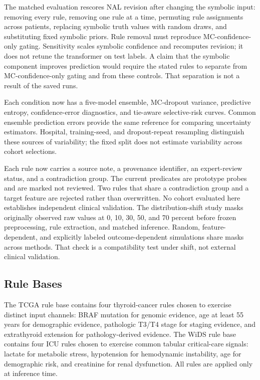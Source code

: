 \documentclass{article}
\begin{document}
The matched evaluation rescores NAL revision after changing the symbolic input: removing every rule, removing one rule at a time, permuting rule assignments across patients, replacing symbolic truth values with random draws, and substituting fixed symbolic priors. Rule removal must reproduce MC-confidence-only gating. Sensitivity scales symbolic confidence and recomputes revision; it does not retune the transformer on test labels. A claim that the symbolic component improves prediction would require the stated rules to separate from MC-confidence-only gating and from these controls. That separation is not a result of the saved runs.

Each condition now has a five-model ensemble, MC-dropout variance, predictive entropy, confidence-error diagnostics, and tie-aware selective-risk curves. Common ensemble prediction errors provide the same reference for comparing uncertainty estimators. Hospital, training-seed, and dropout-repeat resampling distinguish these sources of variability; the fixed split does not estimate variability across cohort selections.

Each rule now carries a source note, a provenance identifier, an expert-review status, and a contradiction group. The current predicates are prototype probes and are marked not reviewed. Two rules that share a contradiction group and a target feature are rejected rather than overwritten. No cohort evaluated here establishes independent clinical validation. The distribution-shift study masks originally observed raw values at 0, 10, 30, 50, and 70 percent before frozen preprocessing, rule extraction, and matched inference. Random, feature-dependent, and explicitly labeled outcome-dependent simulations share masks across methods. That check is a compatibility test under shift, not external clinical validation.

\subsection{Rule Bases}

The TCGA rule base contains four thyroid-cancer rules chosen to exercise distinct input channels: BRAF mutation for genomic evidence, age at least 55 years for demographic evidence, pathologic T3/T4 stage for staging evidence, and extrathyroid extension for pathology-derived evidence. The WiDS rule base contains four ICU rules chosen to exercise common tabular critical-care signals: lactate for metabolic stress, hypotension for hemodynamic instability, age for demographic risk, and creatinine for renal dysfunction. All rules are applied only at inference time.
\end{document}
